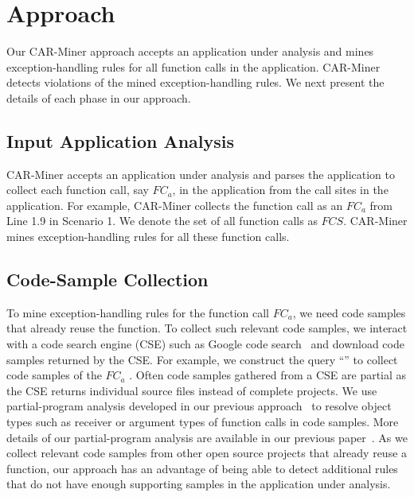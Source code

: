 \section{Approach}
\label{sec:approach}
\vspace*{-2ex}
Our CAR-Miner approach accepts an application under analysis and mines exception-handling rules
for all function calls in the application. CAR-Miner detects violations of the mined exception-handling
rules. We next present the details of each phase in our approach.

\subsection{Input Application Analysis}
\label{sec:gatherce}
\vspace*{-2ex}
CAR-Miner accepts an application under analysis and parses the application to collect
each function call, say $FC_a$, in the application from the call sites in the application. 
For example, CAR-Miner collects
the function call  as an $FC_a$ from Line 1.9 
in Scenario 1. We denote the set of all function calls as $FCS$. CAR-Miner
mines exception-handling rules for all these function calls.

\vspace*{-1.5ex}
\subsection{Code-Sample Collection}
\label{sec:gatherce}
\vspace*{-2ex}
To mine exception-handling rules for the function call $FC_a$, we need code samples
that already reuse the function. To collect such relevant code samples,
we interact with a code search engine (CSE) such as Google code search~\cite{GCSE} and download
code samples returned by the CSE. For example, we construct
the query ``'' to collect
code samples of the $FC_a$ . Often code samples
gathered from a CSE are partial as the CSE returns individual source
files instead of complete projects. We use partial-program analysis 
developed in our previous approach~\cite{thummalapenta07:parseweb} to resolve
object types such as receiver or argument types of function calls in code samples. 
More details of our partial-program analysis are available in our previous paper~\cite{thummalapenta07:parseweb}.
As we collect relevant code samples from other open source projects that already reuse a function, our
approach has an advantage of being able to detect additional rules that do not have enough
supporting samples in the application under analysis.
\vspace*{-1ex}
